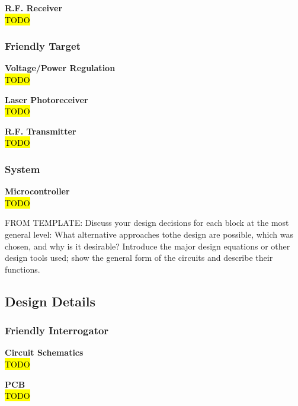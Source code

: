\documentclass[letterpaper,10pt]{article}
\begin{document}
\begin{spacing}{1.15}
\hspace{5mm}\textbf{R.F. Receiver} \label{section:rf-receiver-design-procedure}
\\ \hl{TODO}

\subsubsection{Friendly Target}
\hspace{5mm}\textbf{Voltage/Power Regulation} \label{section:target-voltage-regulation-design-procedure}
\\ \hl{TODO}

\hspace{5mm}\textbf{Laser Photoreceiver} \label{section:laser-photoreceiver-design-procedure}
\\ \hl{TODO}

\hspace{5mm}\textbf{R.F. Transmitter} \label{section:rf-transmitter-design-procedure}
\\ \hl{TODO}


\subsubsection{System}
\hspace{5mm}\textbf{Microcontroller} \label{section:system-design-procedure}
\\ \hl{TODO}

FROM TEMPLATE: Discuss your design decisions for each block at the most general level: What alternative approaches tothe design are possible, which was chosen, and why is it desirable? Introduce the major design equations or other design tools used; show the general form of the circuits and describe their functions.



\subsection{Design Details}

\subsubsection{Friendly Interrogator}
\hspace{5mm}\textbf{Circuit Schematics} \label{section:interrogator-circuit-schematics-design-details}
\\ \hl{TODO}

\hspace{5mm}\textbf{PCB} \label{section:interrogator-pcb-design-details}
\\ \hl{TODO}



\end{spacing}
\end{document}

